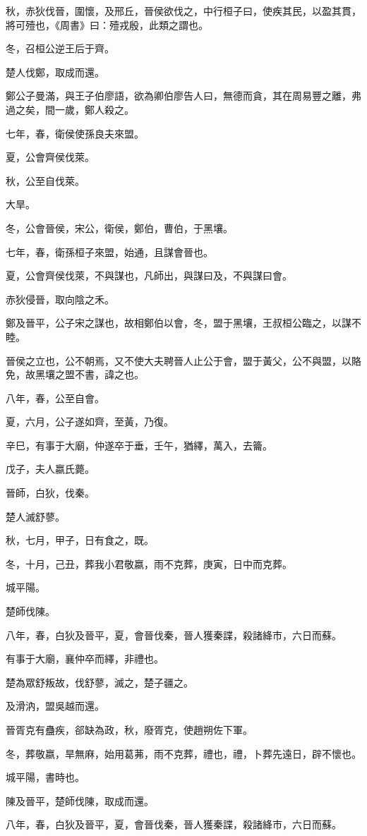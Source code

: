 \begin{pinyinscope}
秋，赤狄伐晉，圍懷，及邢丘，晉侯欲伐之，中行桓子曰，使疾其民，以盈其貫，將可殪也，《周書》曰：殪戎殷，此類之謂也。

冬，召桓公逆王后于齊。

楚人伐鄭，取成而還。

鄭公子曼滿，與王子伯廖語，欲為卿伯廖告人曰，無德而貪，其在周易豐之離，弗過之矣，間一歲，鄭人殺之。

七年，春，衛侯使孫良夫來盟。

夏，公會齊侯伐萊。

秋，公至自伐萊。

大旱。

冬，公會晉侯，宋公，衛侯，鄭伯，曹伯，于黑壤。

七年，春，衛孫桓子來盟，始通，且謀會晉也。

夏，公會齊侯伐萊，不與謀也，凡師出，與謀曰及，不與謀曰會。

赤狄侵晉，取向陰之禾。

鄭及晉平，公子宋之謀也，故相鄭伯以會，冬，盟于黑壤，王叔桓公臨之，以謀不睦。

晉侯之立也，公不朝焉，又不使大夫聘晉人止公于會，盟于黃父，公不與盟，以賂免，故黑壤之盟不書，諱之也。

八年，春，公至自會。

夏，六月，公子遂如齊，至黃，乃復。

辛巳，有事于大廟，仲遂卒于垂，壬午，猶繹，萬入，去籥。

戊子，夫人嬴氏薨。

晉師，白狄，伐秦。

楚人滅舒蓼。

秋，七月，甲子，日有食之，既。

冬，十月，己丑，葬我小君敬嬴，雨不克葬，庚寅，日中而克葬。

城平陽。

楚師伐陳。

八年，春，白狄及晉平，夏，會晉伐秦，晉人獲秦諜，殺諸絳市，六日而蘇。

有事于大廟，襄仲卒而繹，非禮也。

楚為眾舒叛故，伐舒蓼，滅之，楚子疆之。

及滑汭，盟吳越而還。

晉胥克有蠱疾，郤缺為政，秋，廢胥克，使趙朔佐下軍。

冬，葬敬嬴，旱無麻，始用葛茀，雨不克葬，禮也，禮，卜葬先遠日，辟不懷也。

城平陽，書時也。

陳及晉平，楚師伐陳，取成而還。

八年，春，白狄及晉平，夏，會晉伐秦，晉人獲秦諜，殺諸絳市，六日而蘇。


\end{pinyinscope}
